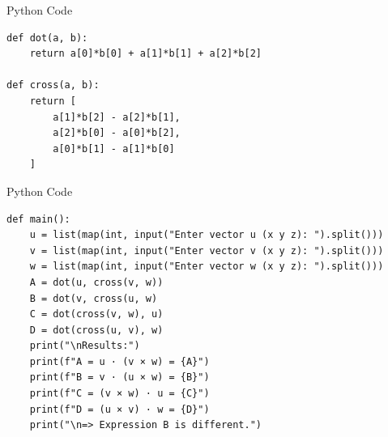 \documentclass{beamer}
\begin{document}
\begin{frame}[fragile]{Python Code}
    \begin{verbatim}
def dot(a, b):
    return a[0]*b[0] + a[1]*b[1] + a[2]*b[2]

def cross(a, b):
    return [
        a[1]*b[2] - a[2]*b[1],
        a[2]*b[0] - a[0]*b[2],
        a[0]*b[1] - a[1]*b[0]
    ]
    \end{verbatim}
\end{frame}

\begin{frame}[fragile]{Python Code}
    \begin{verbatim}
def main():
    u = list(map(int, input("Enter vector u (x y z): ").split()))
    v = list(map(int, input("Enter vector v (x y z): ").split()))
    w = list(map(int, input("Enter vector w (x y z): ").split()))
    A = dot(u, cross(v, w))
    B = dot(v, cross(u, w)
    C = dot(cross(v, w), u)
    D = dot(cross(u, v), w)
    print("\nResults:")
    print(f"A = u · (v × w) = {A}")
    print(f"B = v · (u × w) = {B}")
    print(f"C = (v × w) · u = {C}")
    print(f"D = (u × v) · w = {D}")
    print("\n=> Expression B is different.")
    \end{verbatim}
\end{frame}
\end{document}
